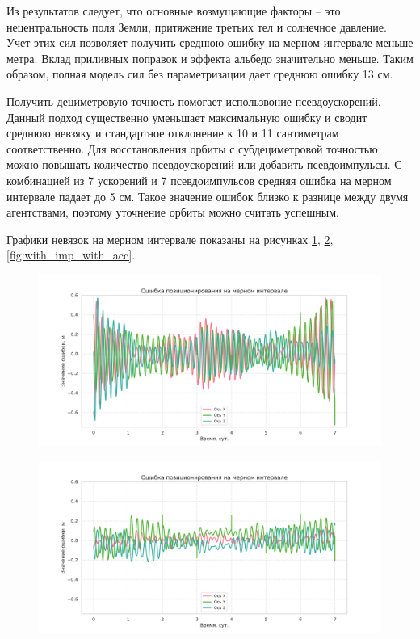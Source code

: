 Из результатов следует, что основные возмущающие факторы -- это нецентральность поля Земли,
притяжение третьих тел и солнечное давление. Учет этих сил позволяет получить среднюю
ошибку на мерном интервале меньше метра. Вклад приливных поправок и эффекта альбедо
значительно меньше. Таким образом, полная модель сил без параметризации дает среднюю ошибку
13 см.

Получить дециметровую точность помогает использвоние псевдоускорений. Данный подход
существенно уменьшает максимальную ошибку и сводит среднюю невзяку и стандартное отклонение
 к 10 и 11 сантиметрам соответственно. Для восстановления орбиты с субдециметровой точностью
 можно повышать количество псевдоускорений или добавить псевдоимпульсы. С комбинацией
 из 7 ускорений и 7 псевдоимпульсов средняя ошибка на мерном интервале падает до 5 см. 
 Такое значение ошибок близко к разнице между двумя агентствами, поэтому
 уточнение орбиты можно считать успешным.

Графики невязок на мерном интервале показаны на рисунках \ref{fig:no_imp_no_acc}, 
\ref{fig:no_imp_with_acc}, \ref{fig:with_imp_with_acc}.

\begin{figure}[h!]
   \centering
   \includegraphics[width=\linewidth]{../images/solution/lageos/no_imp_no_acc.png}
   \label{fig:no_imp_no_acc}
\end{figure}

\begin{figure}[h!]
   \centering
   \includegraphics[width=\linewidth]{../images/solution/lageos/no_imp_with_acc.png}
   \label{fig:no_imp_with_acc}
\end{figure}


